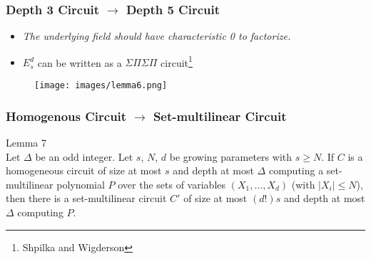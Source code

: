 \documentclass{beamer}
\begin{document}
\begin{frame}[allowframebreaks]
\frametitle{Depth 3 Circuit $\rightarrow$ Depth 5 Circuit}
\begin{multicols}{2}[]
\vspace{1cm}
\begin{itemize}
\item \textit{The underlying field should have characteristic 0 to factorize.}

\item $E_s^d$ can be written as a $\Sigma\Pi\Sigma\Pi$ circuit\footnote{Shpilka and Wigderson}
\end{itemize}

\begin{figure}[H]
    \centering
    \texttt{[image: images/lemma6.png]}
\end{figure}


\end{multicols}
\end{frame}


\begin{frame}[allowframebreaks]
\frametitle{Homogenous Circuit $\rightarrow$ Set-multilinear Circuit}
\begin{exampleblock}{Lemma 7}\\
    Let $\Delta$ be an odd integer. Let $s$, $N$, $d$ be growing parameters with $s \geq N$. If $C$ is a homogeneous circuit of size at most $s$ and depth at most $\Delta$ computing a set-multilinear polynomial $P$ over the sets of variables $(X_1, \dots, X_d)$ (with $|X_i| \leq N$), then there is a set-multilinear circuit $C'$ of size at most $(d!)s$ and depth at most $\Delta$ computing $P$.
\end{exampleblock}
\end{frame}
\end{document}
